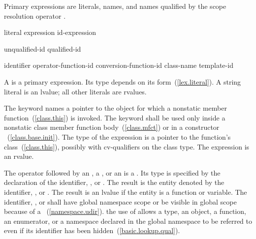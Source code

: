 \pnum
Primary expressions are literals, names, and names qualified by the
scope resolution operator \tcode{::}.

\begin{bnf}
\br
    literal\br
    \br
    \terminal{(} expression \terminal{)}\br
    id-expression
\end{bnf}

\begin{bnf}
\br
    unqualified-id\br
    qualified-id
\end{bnf}

\begin{bnf}
\br
    identifier\br
    operator-function-id\br
    conversion-function-id\br
    \terminal{\tilde} class-name\br
    template-id
\end{bnf}

\pnum
A
%
%
is a primary expression.
Its type depends on its form~(\ref{lex.literal}).
A string literal is an lvalue; all other literals are rvalues.

\pnum
{}%
The keyword  names a pointer to the object for which a nonstatic member
function~(\ref{class.this}) is invoked. The keyword  shall be
used only inside a nonstatic class member function body~(\ref{class.mfct})
or in a constructor ~(\ref{class.base.init}).
The type of the expression is a pointer to the function's
class~(\ref{class.this}), possibly with cv-qualifiers on the class type.
The expression is an rvalue.

\pnum
The operator \tcode{::} followed by an , a
, or an 
is a . Its type is specified by the
declaration of the identifier, , or
. The result is the entity denoted by
the identifier, , or
. The result is an lvalue if the entity
is a function or variable. The identifier, , or
 shall have global namespace scope or be
visible in global scope because of a
~(\ref{namespace.udir}).
\enternote the use of \tcode{::} allows a type, an object, a function,
an enumerator, or a namespace declared in the global namespace to be
referred to even if its identifier has been hidden~(\ref{basic.lookup.qual}).
\exitnote

